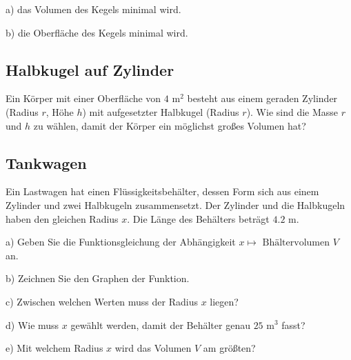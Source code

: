 a) das Volumen des Kegels minimal wird.

b) die Oberfläche des Kegels minimal wird.



\subsection{Halbkugel auf Zylinder}
Ein Körper mit einer Oberfläche von $4 \text{ m}^2$ besteht aus einem geraden Zylinder (Radius $r$, Höhe $h$) mit aufgesetzter Halbkugel (Radius $r$). Wie sind die Masse $r$ und $h$ zu wählen, damit der Körper ein möglichst großes Volumen hat?


\subsection{Tankwagen}

Ein Lastwagen hat einen Flüssigkeitsbehälter, dessen
Form sich aus einem Zylinder und zwei Halbkugeln zusammensetzt. Der Zylinder und die Halbkugeln haben den
gleichen Radius $x$. Die Länge des Behälters beträgt $4.2 \text{ m}$.


a) 
Geben Sie die Funktionsgleichung der Abhängigkeit $x \mapsto \text{ Bhältervolumen } V$ an.

b)
Zeichnen Sie den Graphen der Funktion.

c)
Zwischen welchen Werten muss der Radius $x$ liegen?

d)
Wie muss $x$ gewählt werden, damit der Behälter genau $25 \text{ m}^3$
fasst?

e)
Mit welchem Radius $x$ wird das Volumen $V$ am größten?


